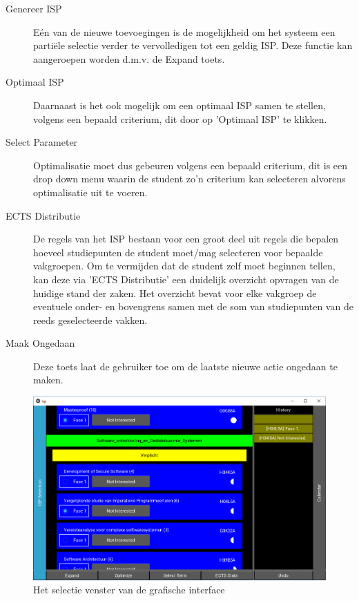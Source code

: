 \begin{description}
\item [Genereer ISP] E\'{e}n van de nieuwe toevoegingen is de mogelijkheid om het systeem een parti\"{e}le selectie verder te vervolledigen tot een geldig ISP. Deze functie kan aangeroepen worden d.m.v. de Expand toets.
\item[Optimaal ISP] Daarnaast is het ook mogelijk om een optimaal ISP samen te stellen, volgens een bepaald criterium, dit door op 'Optimaal ISP' te klikken.
\item[Select Parameter] Optimalisatie moet dus gebeuren volgens een bepaald criterium, dit is een drop down menu waarin de student zo'n criterium kan selecteren alvorens optimalisatie uit te voeren.
\item[ECTS Distributie] De regels van het ISP bestaan voor een groot deel uit regels die bepalen hoeveel studiepunten de student moet/mag selecteren voor bepaalde vakgroepen. Om te vermijden dat de student zelf moet beginnen tellen, kan deze via 'ECTS Distributie' een duidelijk overzicht opvragen van de huidige stand der zaken. Het overzicht bevat voor elke vakgroep de eventuele onder- en bovengrens samen met de som van studiepunten van de reeds geselecteerde vakken.
\item[Maak Ongedaan] Deze toets laat de gebruiker toe om de laatste nieuwe actie ongedaan te maken. 
\end{description}

\begin{figure}
\caption{Het selectie venster van de grafische interface\label{fig:sc1}}
\centering
\includegraphics[scale=.5]{sc1.png}
\end{figure}

